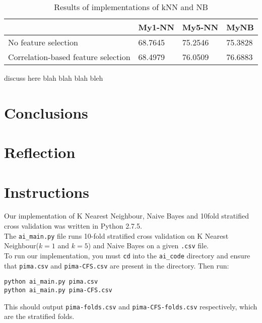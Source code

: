 \documentclass{article}
\renewcommand{\tt}{\texttt}
\begin{document}
\begin{table}[h]
\begin{tabular}{@{}llll@{}}
\hline
                                    & My1-NN  & My5-NN  & MyNB    \\ \hline
No feature selection                & 68.7645 & 75.2546 & 75.3828 \\
Correlation-based feature selection & 68.4979 & 76.0509 & 76.6883 \\ \hline
\end{tabular}
\caption {Results of implementations of kNN and NB}
\end{table}

discuss here blah blah blah bleh

\section{Conclusions}
\section{Reflection}
\section{Instructions}
Our implementation of K Nearest Neighbour, Naive Bayes and 10\-fold stratified cross validation was written in Python 2.7.5.\\

The \tt{ai\_main.py} file runs 10-fold stratified cross validation on K Nearest Neighbour($k=1$ and $k=5$) and Naive Bayes on a given \tt{.csv} file.\\

To run our implementation, you must \tt{cd} into the \tt{ai\_code} directory and ensure that \tt{pima.csv} and \tt{pima-CFS.csv} are present in the directory. Then run:
\begin{lstlisting}
python ai_main.py pima.csv
python ai_main.py pima-CFS.csv
\end{lstlisting}

This should output \tt{pima-folds.csv} and \tt{pima-CFS-folds.csv} respectively, which are the stratified folds.
\end{document}
